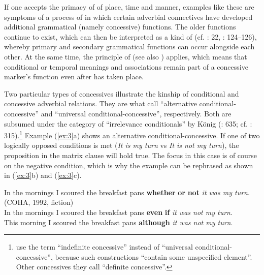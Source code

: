If one accepts the primacy of  of place, time and manner, examples like these are symptoms of a process of  in which certain adverbial connectives have developed additional grammatical (namely concessive) functions. The older functions continue to exist, which can then be interpreted as a kind of \textit{} (cf. \citealt{Hopper1991}: 22, \citealt{HopperTraugott2003}: 124–126), whereby primary and secondary grammatical functions can occur alongside each other. At the same time, the principle of \textit{} (see also \citealt{Hopper1991}) applies, which means that conditional or temporal meanings and associations remain part of a concessive marker’s function even after  has taken place.

Two particular types of concessives illustrate the kinship of conditional and concessive adverbial relations. They are what \citet[1099–1102]{QuirkEtAl1985} call “alternative conditional-concessive” and “universal conditional-concessive”, respectively. Both are subsumed under the category of “irrelevance conditionals” by König (\citeyear{König1991b}: 635; cf. \citealt{KönigEisenberg1984}: 315).\footnote{\citet[262–263]{ThompsonEtAl2007} use the term “indefinite concessive” instead of   “universal conditional-concessive”, because such constructions “contain some unspecified element”. Other concessives they call “definite concessive”.} Example (\ref{ex:3}a) shows an alternative conditional-concessive. If one of two logically opposed conditions is met (\textit{It is my turn} vs \textit{It is not my turn}), the proposition in the matrix clause will hold true. The focus in this case is of course on the negative condition, which is why the example can be rephrased as shown in (\ref{ex:3}b) and (\ref{ex:3}c).

\ea\label{ex:3}
    \ea\label{ex:3a}\label{bkm:Ref467066205}In the mornings I scoured the breakfast pans \textbf{whether} \textbf{or} \textbf{not} \textit{it was my turn}. (COHA, 1992, fiction)\\
    \ex\label{ex:3b}In the mornings I scoured the breakfast pans \textbf{even} \textbf{if} \textit{it was not my turn}.\\
    \ex\label{ex:3c}This morning I scoured the breakfast pans \textbf{although} \textit{it was not my turn}.\\
  \z
\z


